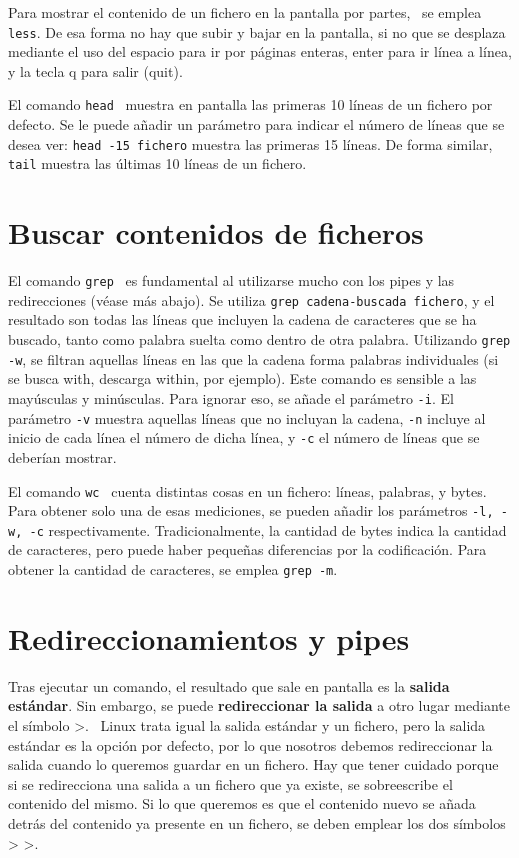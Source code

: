 Para mostrar el contenido de un fichero en la pantalla por partes,  \ se emplea \texttt{less}. De esa forma no hay que subir y bajar en la pantalla, si no que se desplaza mediante el uso del espacio para ir por páginas enteras, enter para ir línea a línea, y la tecla q para salir (quit). 

El comando \texttt{head}  \ muestra en pantalla las primeras 10 líneas de un fichero por defecto. Se le puede añadir un parámetro para indicar el número de líneas que se desea ver: \texttt{head -15 fichero} muestra las primeras 15 líneas. De forma similar, \texttt{tail} muestra las últimas 10 líneas de un fichero.

\section{Buscar contenidos de ficheros}
El comando \texttt{grep}  \ es fundamental al utilizarse mucho con los pipes y las redirecciones (véase más abajo). Se utiliza \texttt{grep cadena-buscada fichero}, y el resultado son todas las líneas que incluyen la cadena de caracteres que se ha buscado, tanto como palabra suelta como dentro de otra palabra. Utilizando \texttt{grep -w}, se filtran aquellas líneas en las que la cadena forma palabras individuales (si se busca with, descarga within, por ejemplo). Este comando es sensible a las mayúsculas y minúsculas. Para ignorar eso, se añade el parámetro \texttt{-i}. El parámetro \texttt{-v} muestra aquellas líneas que no incluyan la cadena, \texttt{-n} incluye al inicio de cada línea el número de dicha línea, y \texttt{-c} el número de líneas que se deberían mostrar.

El comando \texttt{wc} \marginpar[\footnotesize wc] \ cuenta distintas cosas en un fichero: líneas, palabras, y bytes. Para obtener solo una de esas mediciones, se pueden añadir los parámetros \texttt{-l, -w, -c} respectivamente. Tradicionalmente, la cantidad de bytes indica la cantidad de caracteres, pero puede haber pequeñas diferencias por la codificación. Para obtener la cantidad de caracteres, se emplea \texttt{grep -m}.

\section{Redireccionamientos y pipes}
Tras ejecutar un comando, el resultado que sale en pantalla es la \textbf{salida estándar}. Sin embargo, se puede \textbf{redireccionar la salida} a otro lugar mediante el símbolo >. \marginpar[\footnotesize > \\ > >] \ Linux trata igual la salida estándar y un fichero, pero la salida estándar es la opción por defecto, por lo que nosotros debemos redireccionar la salida cuando lo queremos guardar en un fichero. Hay que tener cuidado porque si se redirecciona una salida a un fichero que ya existe, se sobreescribe el contenido del mismo. Si lo que queremos es que el contenido nuevo se añada detrás del contenido ya presente en un fichero, se deben emplear los dos símbolos > >. 

